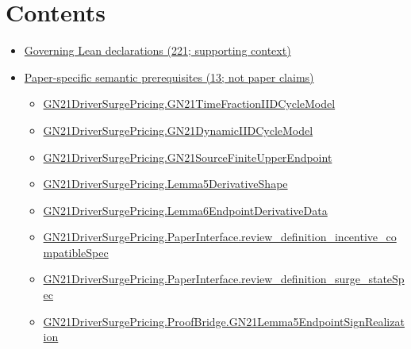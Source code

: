 \documentclass[10pt]{article}
\begin{document}
\section*{Contents}
\begin{itemize}[leftmargin=1.2em]
\item \hyperlink{governing-declaration-section-5ef5ef0364b6939c}{Governing Lean declarations (221; supporting context)}
\item \hyperlink{paper-prerequisite-section-5ef5ef0364b6939c}{Paper-specific semantic prerequisites (13; not paper claims)}
\begin{itemize}[leftmargin=1.2em]
\item \hyperlink{paper-prerequisite-be12410503a9b0bd}{GN21\allowbreak{}Driver\allowbreak{}Surge\allowbreak{}Pricing.\allowbreak{}GN21\allowbreak{}Time\allowbreak{}Fraction\allowbreak{}IID\allowbreak{}Cycle\allowbreak{}Model}
\item \hyperlink{paper-prerequisite-470400593141b2a3}{GN21\allowbreak{}Driver\allowbreak{}Surge\allowbreak{}Pricing.\allowbreak{}GN21\allowbreak{}Dynamic\allowbreak{}IID\allowbreak{}Cycle\allowbreak{}Model}
\item \hyperlink{paper-prerequisite-54eb122b4e9d9f24}{GN21\allowbreak{}Driver\allowbreak{}Surge\allowbreak{}Pricing.\allowbreak{}GN21\allowbreak{}Source\allowbreak{}Finite\allowbreak{}Upper\allowbreak{}Endpoint}
\item \hyperlink{paper-prerequisite-bdf8218f91905191}{GN21\allowbreak{}Driver\allowbreak{}Surge\allowbreak{}Pricing.\allowbreak{}Lemma5\allowbreak{}Derivative\allowbreak{}Shape}
\item \hyperlink{paper-prerequisite-c788598c55db0e43}{GN21\allowbreak{}Driver\allowbreak{}Surge\allowbreak{}Pricing.\allowbreak{}Lemma6\allowbreak{}Endpoint\allowbreak{}Derivative\allowbreak{}Data}
\item \hyperlink{paper-prerequisite-c17cbc11714a18c6}{GN21\allowbreak{}Driver\allowbreak{}Surge\allowbreak{}Pricing.\allowbreak{}Paper\allowbreak{}Interface.\allowbreak{}review\_\allowbreak{}definition\_\allowbreak{}incentive\_\allowbreak{}compatible\allowbreak{}Spec}
\item \hyperlink{paper-prerequisite-8cb807f3cc8978b3}{GN21\allowbreak{}Driver\allowbreak{}Surge\allowbreak{}Pricing.\allowbreak{}Paper\allowbreak{}Interface.\allowbreak{}review\_\allowbreak{}definition\_\allowbreak{}surge\_\allowbreak{}state\allowbreak{}Spec}
\item \hyperlink{paper-prerequisite-d8d86ba99f27fa35}{GN21\allowbreak{}Driver\allowbreak{}Surge\allowbreak{}Pricing.\allowbreak{}Proof\allowbreak{}Bridge.\allowbreak{}GN21\allowbreak{}Lemma5\allowbreak{}Endpoint\allowbreak{}Sign\allowbreak{}Realization}

\end{itemize}
\end{itemize}
\end{document}
